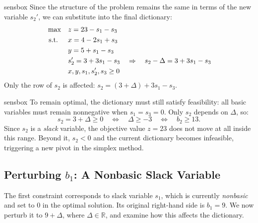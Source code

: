 \begin{steppanel}{sensbox}
Since the structure of the problem remains the same in terms of the new variable \( s_2' \), we can substitute into the final dictionary:
\[
\begin{aligned}
\max \quad
& z = 23 - s_1 - s_3 \\
\mbox{ s.t. } \quad
& x = 4 - 2s_1 + s_3 \\
& y = 5 + s_1 - s_3 \\
& s_2'  = 3 + 3s_1 - s_3
\quad \Rightarrow \quad
s_2 - \Delta = 3  + 3s_1 - s_3 \\
& x, y, s_1, s_2', s_3 \geq 0
\end{aligned}
\]
Only the row of \( s_2 \) is affected: \( s_2 = (3 + \Delta) + 3s_1 - s_3 \).
\end{steppanel}

\begin{steppanel}{sensbox}
To remain optimal, the dictionary must still satisfy feasibility: all basic variables must remain nonnegative when \( s_1 = s_3 = 0 \). Only \( s_2 \) depends on \( \Delta \), so:
\[
s_2 = 3 + \Delta \geq 0
\quad\Longleftrightarrow\quad
\boxed{\Delta \geq -3}
\quad\Longleftrightarrow\quad
b_2 \geq 13.
\]
Since \( s_2 \) is a \emph{slack} variable, the objective value \( z = 23 \) does not move at all inside this range. Beyond it, \( s_2 < 0 \) and the current dictionary becomes infeasible, triggering a new pivot in the simplex method.
\end{steppanel}

\subsection{Perturbing \( b_1 \): A Nonbasic Slack Variable}

The first constraint corresponds to slack variable \( s_1 \), which is currently \emph{nonbasic} and set to 0 in the optimal solution. Its original right-hand side is \( b_1 = 9 \). We now perturb it to \( 9 + \Delta \), where \( \Delta \in \mathbb{R} \), and examine how this affects the dictionary.

